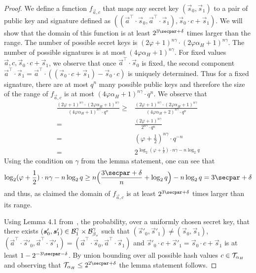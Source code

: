 \begin{proof}
  We define a function $f_{\vec{a}, c}$ that maps any secret key $(\vec{s}_0, \vec{s}_1)$ to a pair of public key and signature defined as $((\vec{a}^\intercal\cdot\vec{s}_0,\vec{a}^\intercal\cdot\vec{s}_1), \vec{s}_0\cdot c + \vec{s}_1)$.
  We will show that the domain of this function is at least $2^{3\secpar + \delta}$ times larger than the range.
  The number of possible secret keys is $(2\varphi+1)^{n\gamma} \cdot (2\varphi\alpha_H+1)^{n\gamma}$.
  The number of possible signatures is at most $(4\varphi\alpha_H + 1)^{n\gamma}$.
  For fixed values $\vec{a}, c, \vec{s}_0\cdot c + \vec{s}_1$, we observe that once $\vec{a}^\intercal\cdot\vec{s}_0$ is fixed, the second component $\vec{a}^\intercal\cdot\vec{s}_1 = \vec{a}^\intercal \cdot ((\vec{s}_0\cdot c + \vec{s}_1) - \vec{s}_0 \cdot c)$ is uniquely determined.
  Thus for a fixed signature, there are at most $q^n$ many possible public keys and therefore the size of the range of $f_{\vec{a}, c}$ is at most $(4 \varphi\alpha_H + 1)^{n\gamma} \cdot q^n$.
  We observe that
  \begin{align*}\frac{(2\varphi+1)^{n\gamma} \cdot (2\varphi\alpha_H+1)^{n\gamma}}{(4 \varphi\alpha_H + 1)^{n\gamma} \cdot q^n}
   \geq{}& \frac{(2\varphi+1)^{n\gamma} \cdot (2\varphi\alpha_H+1)^{n\gamma}}{(4 \varphi\alpha_H + 2)^{n\gamma} \cdot q^n}\\
   ={}& \frac{(2\varphi+1)^{n\gamma}}{2^{n\gamma} \cdot q^n}\\
   ={}& (\varphi+\frac{1}{2})^{n\gamma} \cdot q^{-n}\\
   ={}& 2^{\log_2(\varphi+\frac{1}{2})\cdot{n\gamma} - n \log_2 q}
  \end{align*}
  Using the condition on $\gamma$ from the lemma statement, one can see that
  \[
    \log_2(\varphi+\frac{1}{2})\cdot{n\gamma} - n \log_2 q
    \geq n\Bigl(\frac{3\secpar+\delta}{n}+\log_2q\Bigr) - n \log_2 q = 3\secpar+\delta
  \]
  and thus, as claimed the domain of $f_{\vec{a},c}$ is at least $2^{3\secpar + \delta}$ times larger than its range.
  
  Using Lemma 4.1 from~\cite{TCC:LyuMic08}, the probability, over a uniformly chosen secret key, that there exists $(\boldsymbol{s}'_0,\boldsymbol{s}'_1)\in \mathcal{B}_{1}^\gamma \times \mathcal{B}_{\beta_s}^\gamma$ such that $(\vec{s}'_0,\vec{s}'_1)\neq(\vec{s}_0,\vec{s}_1)$, $(\vec{a}^\intercal\cdot\vec{s}'_0,\vec{a}^\intercal\cdot\vec{s}'_1) = (\vec{a}^\intercal\cdot\vec{s}_0,\vec{a}^\intercal\cdot\vec{s}_1)$ and $\vec{s}'_0\cdot c + \vec{s}'_1 = \vec{s}_0\cdot c + \vec{s}_1$ is at least $1-2^{-3\secpar-\delta}$.
  By union bounding over all possible hash values $c \in \mathcal{T}_{\alpha_H}$ and observing that $\tern_{\alpha_H} \leq 2^{2\secpar + \delta}$ the lemma statement follows. 
\end{proof}

